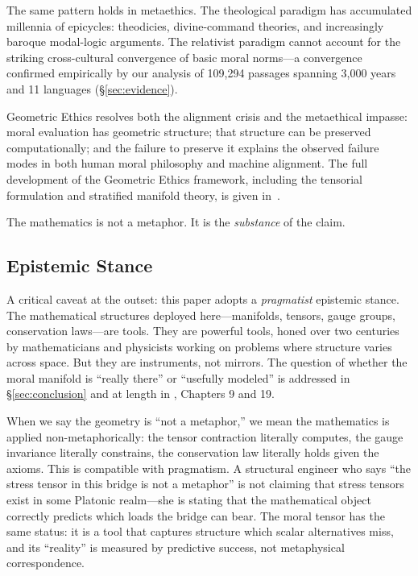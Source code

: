 \documentclass[12pt]{article}
\theoremstyle{definition}
\theoremstyle{remark}
\begin{document}
The same pattern holds in metaethics. The theological paradigm has accumulated millennia of epicycles: theodicies, divine-command theories, and increasingly baroque modal-logic arguments. The relativist paradigm cannot account for the striking cross-cultural convergence of basic moral norms---a convergence confirmed empirically by our analysis of 109,294 passages spanning 3,000 years and 11 languages (\S\ref{sec:evidence}).

Geometric Ethics resolves both the alignment crisis and the metaethical impasse: moral evaluation has geometric structure; that structure can be preserved computationally; and the failure to preserve it explains the observed failure modes in both human moral philosophy and machine alignment. The full development of the Geometric Ethics framework, including the tensorial formulation and stratified manifold theory, is given in~\citet{anon2026a}.

The mathematics is not a metaphor. It is the \emph{substance} of the claim.

\subsection{Epistemic Stance}

A critical caveat at the outset: this paper adopts a \emph{pragmatist} epistemic stance. The mathematical structures deployed here---manifolds, tensors, gauge groups, conservation laws---are tools. They are powerful tools, honed over two centuries by mathematicians and physicists working on problems where structure varies across space. But they are instruments, not mirrors. The question of whether the moral manifold is ``really there'' or ``usefully modeled'' is addressed in \S\ref{sec:conclusion} and at length in \citet{anon2026a}, Chapters 9 and 19.

When we say the geometry is ``not a metaphor,'' we mean the mathematics is applied non-metaphorically: the tensor contraction literally computes, the gauge invariance literally constrains, the conservation law literally holds given the axioms. This is compatible with pragmatism. A structural engineer who says ``the stress tensor in this bridge is not a metaphor'' is not claiming that stress tensors exist in some Platonic realm---she is stating that the mathematical object correctly predicts which loads the bridge can bear. The moral tensor has the same status: it is a tool that captures structure which scalar alternatives miss, and its ``reality'' is measured by predictive success, not metaphysical correspondence.
\end{document}
